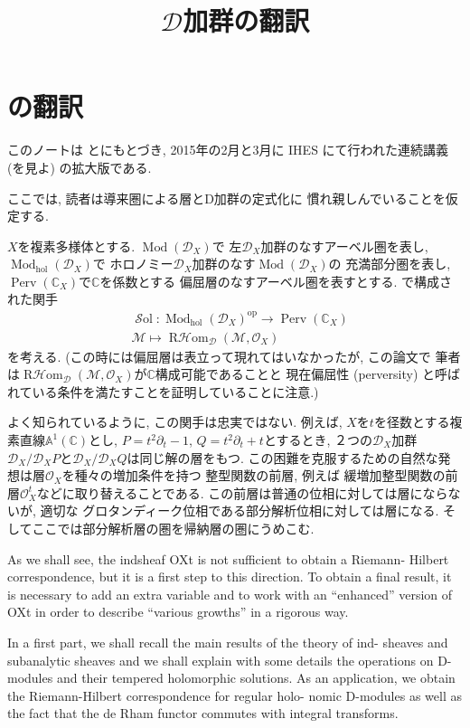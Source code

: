\documentclass[12pt,a4paper]{jsarticle}
\title{$\mathcal{D}$加群の翻訳}
\author{}
\theoremstyle{plain}
\theoremstyle{definition}
\theoremstyle{remark}
\newcommand{\CC}{\mathbb{C}}
\newcommand{\Mod}{\mathop{\mathrm{Mod}}\nolimits}
\newcommand{\hol}{\mathop{\mathrm{hol}}\nolimits}
\newcommand{\Perv}{\mathop{\mathrm{Perv}}\nolimits}
\newcommand{\op}{\mathop{\mathrm{op}}\nolimits}
\newcommand{\shhol}[1]{\mathscr{O}_{#1}}
\newcommand{\DD}{\mathscr{D}}
\newcommand{\Sol}{\mathop{{\mathcal{S}ol}}\nolimits}
\newcommand{\MM}{\mathscr{M}}
\newcommand{\Rhom}{\mathop{{\mathrm{R}\mathscr{H}om}}\nolimits}
\numberwithin{equation}{section}
\begin{document}
\maketitle


\section*{\cite[Introduction]{KS16}の翻訳}

このノートは \cite{DK13}と\cite{KS14}にもとづき, 
2015年の2月と3月に IHES にて行われた連続講義 (\cite{KS15}を見よ) 
の拡大版である. 

ここでは, 読者は導来圏による層とD加群の定式化に
慣れ親しんでいることを仮定する. 

$X$を複素多様体とする. $\Mod(\DD_X)$で
左$\DD_X$加群のなすアーベル圏を表し, $\Mod_{\hol}(\DD_X)$で
ホロノミー$\DD_X$加群のなす$\Mod(\DD_X)$の
充満部分圏を表し, $\Perv(\CC_X)$で$\CC$を係数とする
偏屈層のなすアーベル圏を表すとする. \cite{Ka75}で構成された関手
\begin{align*}
    &\Sol \colon \Mod_{\hol}(\DD_X)^{\op} \to \Perv(\CC_X)\\
    &\MM \mapsto \Rhom_{\DD}(\MM, \shhol{X})
\end{align*}
を考える. (この時には偏屈層は表立って現れてはいなかったが, この論文で
筆者は$\Rhom_{\DD}(\MM,\shhol{X})$が$\CC$構成可能であることと
現在偏屈性 (perversity) と呼ばれている条件を満たすことを証明していることに注意.)

よく知られているように, この関手は忠実ではない. 
例えば, $X$を$t$を径数とする複素直線$\mathbb{A}^1(\CC)$とし, $P=t^2\partial_t-1$, $Q=t^2\partial_t+t$とするとき, 
２つの$\DD_X$加群$\DD_X/\DD_X P$と$\DD_X/\DD_XQ$は同じ解の層をもつ. 
この困難を克服するための自然な発想は層$\shhol{X}$を種々の増加条件を持つ
整型関数の前層, 例えば
緩増加整型関数の前層$\shhol{X}^{t}$などに取り替えることである. 
この前層は普通の位相に対しては層にならないが, 適切な
グロタンディーク位相である部分解析位相に対しては層になる. 
そしてここでは部分解析層の圏を帰納層の圏にうめこむ. 

As we shall see, the indsheaf OXt is not sufficient 
to obtain a Riemann- Hilbert correspondence, 
but it is a first step to this direction. 
To obtain a final result, 
it is necessary to add an extra variable and 
to work with an “enhanced” version of OXt in order 
to describe “various growths” in a rigorous way.

In a first part, 
we shall recall the main results of the theory 
of ind- sheaves and subanalytic sheaves 
and we shall explain with some details the
operations on D-modules and their tempered holomorphic solutions. As an application, we obtain the Riemann-Hilbert correspondence for regular holo- nomic D-modules as well as the fact that the de Rham functor commutes with integral transforms.
\end{document}
